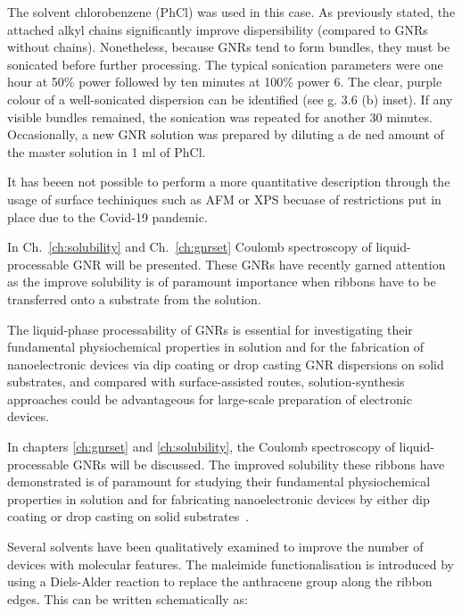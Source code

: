 The solvent chlorobenzene (PhCl) was used in this case. As previously stated, the attached alkyl chains significantly improve dispersibility (compared to GNRs without chains). Nonetheless, because GNRs tend to form bundles, they must be sonicated before further processing. The typical sonication parameters were one hour at 50\% power followed by ten minutes at 100\% power 6. The clear, purple colour of a well-sonicated dispersion can be identified (see g. 3.6 (b) inset). If any visible bundles remained, the sonication was repeated for another 30 minutes. Occasionally, a new GNR solution was prepared by diluting a de ned amount of the master solution in 1 ml of PhCl.

It has beeen not possible to perform a more quantitative description through the usage of surface techiniques such as \gls{AFM} or XPS becuase of restrictions put in place due to the Covid-19 pandemic.


In Ch.~\ref{ch:solubility} and Ch.~\ref{ch:gnrset} Coulomb spectroscopy of liquid-processable GNR will be presented. These GNRs have recently garned attention as the improve
solubility is of paramount importance when ribbons have to be transferred onto a substrate from the solution.

The liquid-phase processability of GNRs is essential for investigating their fundamental physiochemical properties in solution and for the fabrication of nanoelectronic devices via dip coating or drop casting GNR dispersions on solid substrates, and compared with surface-assisted routes, solution-synthesis approaches could be advantageous for large-scale preparation of electronic devices.

In chapters \ref{ch:gnrset} and \ref{ch:solubility}, the Coulomb spectroscopy of liquid-processable \glspl{GNR} will be discussed. The improved solubility these ribbons have demonstrated is of paramount for studying their fundamental physiochemical properties in solution and for fabricating nanoelectronic devices by either dip coating or drop casting on solid substrates~\cite{huang2018supramolecular, narita2014synthesis, niu2019synthetic, yoon2020liquid, saraswat2021materials}.

Several solvents have been qualitatively examined to improve the number of devices with molecular features. The maleimide functionalisation is introduced by using a Diels-Alder reaction to replace the anthracene group along the ribbon edges. This can be written schematically as:

